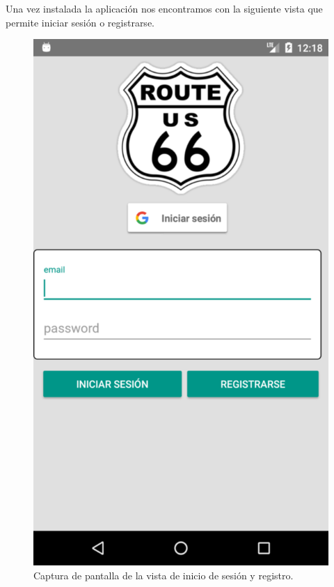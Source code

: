 \documentclass[twoside]{report}
\begin{document}
Una vez instalada la aplicación nos encontramos con la siguiente vista que permite iniciar sesión o registrarse.

\begin{figure}[H]
\begin{center}
\includegraphics[scale=0.2]{images/userguide/0.png}
\caption{Captura de pantalla de la vista de inicio de sesión y registro.}
\end{center}
\end{figure}
\end{document}
